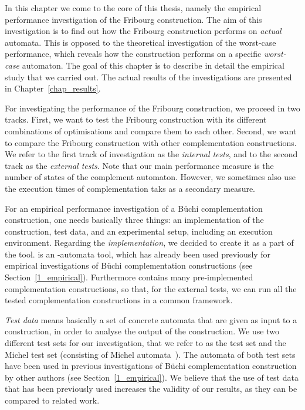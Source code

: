 In this chapter we come to the core of this thesis, namely the empirical performance investigation of the Fribourg construction. The aim of this investigation is to find out how the Fribourg construction performs on \textit{actual} automata. This is opposed to the theoretical investigation of the worst-case performance, which reveals how the construction performs on a specific \textit{worst-case} automaton. The goal of this chapter is to describe in detail the empirical study that we carried out. The actual results of the investigations are presented in Chapter~\ref{chap_results}.

For investigating the performance of the Fribourg construction, we proceed in two tracks. First, we want to test the Fribourg construction with its different combinations of optimisations and compare them to each other. Second, we want to compare the Fribourg construction with other complementation constructions. We refer to the first track of investigation as the \textit{internal tests}, and to the second track as the \textit{external tests}. Note that our main performance measure is the number of states of the complement automaton. However, we sometimes also use the execution times of complementation taks as a secondary measure.

For an empirical performance investigation of a Büchi complementation construction, one needs basically three things: an implementation of the construction, test data, and an experimental setup, including an execution environment. Regarding the \textit{implementation}, we decided to create it as a part of the \goal{} tool. \goal{} is an \om-automata tool, which has already been used previously for empirical investigations of Büchi complementation constructions (see Section~\ref{1_empirical}). Furthermore \goal{} contains many pre-implemented complementation constructions, so that, for the external tests, we can run all the tested complementation constructions in a common framework.

\textit{Test data} means basically a set of concrete automata that are given as input to a construction, in order to analyse the output of the construction. We use two different test sets for our investigation, that we refer to as the \goal{} test set and the Michel test set (consisting of Michel automata~\cite{michel1988}). The automata of both test sets have been used in previous investigations of Büchi complementation construction by other authors (see Section~\ref{1_empirical}). We believe that the use of test data that has been previously used increases the validity of our results, as they can be compared to related work.

